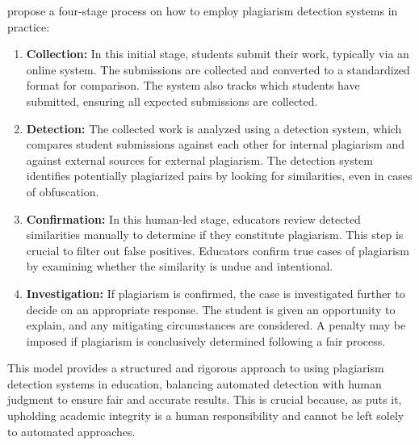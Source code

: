 \citet{Culwin2001} propose a four-stage process on how to employ plagiarism detection systems in practice:
\begin{enumerate}
    \item \textbf{Collection:} In this initial stage, students submit their work, typically via an online system. The submissions are collected and converted to a standardized format for comparison. The system also tracks which students have submitted, ensuring all expected submissions are collected.
    \item \textbf{Detection:} The collected work is analyzed using a detection system, which compares student submissions against each other for internal plagiarism and against external sources for external plagiarism. The detection system identifies potentially plagiarized pairs by looking for similarities, even in cases of obfuscation.
    \item \textbf{Confirmation:} In this human-led stage, educators review detected similarities manually to determine if they constitute plagiarism. This step is crucial to filter out false positives. Educators confirm true cases of plagiarism by examining whether the similarity is undue and intentional.
    \item \textbf{Investigation:} If plagiarism is confirmed, the case is investigated further to decide on an appropriate response. The student is given an opportunity to explain, and any mitigating circumstances are considered. A penalty may be imposed if plagiarism is conclusively determined following a fair process.
\end{enumerate}
This model provides a structured and rigorous approach to using plagiarism detection systems in education, balancing automated detection with human judgment to ensure fair and accurate results.
This is crucial because, as \citet{Weber2019} puts it, upholding academic integrity is a human responsibility and cannot be left solely to automated approaches.

